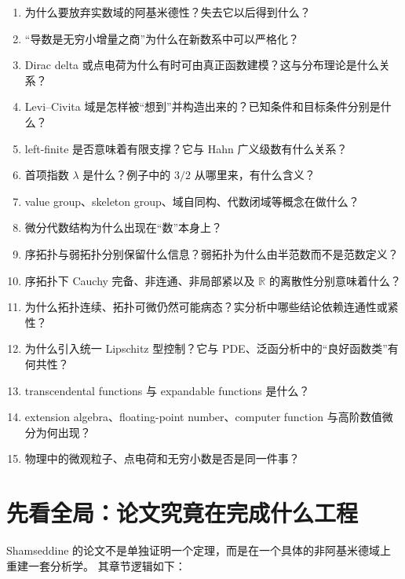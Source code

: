 \documentclass[11pt,a4paper]{article}
\theoremstyle{remark}
\newcommand{\R}{\mathbb R}
\begin{document}
\begin{enumerate}
\item 为什么要放弃实数域的阿基米德性？失去它以后得到什么？
\item “导数是无穷小增量之商”为什么在新数系中可以严格化？
\item Dirac delta 或点电荷为什么有时可由真正函数建模？这与分布理论是什么关系？
\item Levi--Civita 域是怎样被“想到”并构造出来的？已知条件和目标条件分别是什么？
\item left-finite 是否意味着有限支撑？它与 Hahn 广义级数有什么关系？
\item 首项指数 $\lambda$ 是什么？例子中的 $3/2$ 从哪里来，有什么含义？
\item value group、skeleton group、域自同构、代数闭域等概念在做什么？
\item 微分代数结构为什么出现在“数”本身上？
\item 序拓扑与弱拓扑分别保留什么信息？弱拓扑为什么由半范数而不是范数定义？
\item 序拓扑下 Cauchy 完备、非连通、非局部紧以及 $\R$ 的离散性分别意味着什么？
\item 为什么拓扑连续、拓扑可微仍然可能病态？实分析中哪些结论依赖连通性或紧性？
\item 为什么引入统一 Lipschitz 型控制？它与 PDE、泛函分析中的“良好函数类”有何共性？
\item transcendental functions 与 expandable functions 是什么？
\item extension algebra、floating-point number、computer function 与高阶数值微分为何出现？
\item 物理中的微观粒子、点电荷和无穷小数是否是同一件事？
\end{enumerate}

\section{先看全局：论文究竟在完成什么工程}

Shamseddine 的论文不是单独证明一个定理，而是在一个具体的非阿基米德域上重建一套分析学。
其章节逻辑如下：
\end{document}
